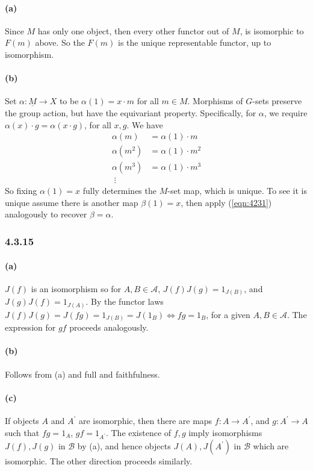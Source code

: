 \documentclass{article}
\begin{document}
\paragraph{(a)} Since $M$ has only one object, then every other functor out of $M$, is isomorphic to $F(m)$ above. So the $F(m)$ is the unique representable functor, up to isomorphism.

\paragraph{(b)} Set $\alpha\colon \underline{M}  \rightarrow X$ to be $\alpha(1) = x \cdot m$ for all $m \in M$. Morphisms of $G$-sets preserve the group action, but have the equivariant property. Specifically, for $\alpha$, we require $\alpha(x) \cdot g = \alpha (x \cdot g)$, for all $x, g$. We have
\begin{equation}
\label{eqn:4231}
\begin{aligned}
  \alpha(m) &= \alpha(1) \cdot m \\
  \alpha(m^2) &= \alpha(1) \cdot m^2 \\
  \alpha(m^3) &= \alpha(1) \cdot m^3 \\
  \; \vdots
\end{aligned}
\end{equation}
So fixing $\alpha(1) = x$ fully determines the $M$-set map, which is unique. To see it is unique assume there is another map $\beta(1) = x$, then apply (\ref{eqn:4231}) analogously to recover $\beta = \alpha$.

\subsubsection*{4.3.15}

\paragraph{(a)}
$J(f)$ is an isomorphism so for $A, B \in \mathcal{A}$, $J(f)J(g) = 1_{J(B)}$, and $J(g)J(f) = 1_{J(A)}$. By the functor laws $J(f)J(g)=J(fg)=1_{J(B)}=J(1_B) \iff fg = 1_B$, for a given $A, B \in \mathcal{A}$. The expression for $gf$ proceeds analogously.

\paragraph{(b)} Follows from (a) and full and faithfulness.

\paragraph{(c)} If objects $A$ and $A^\prime$ are isomorphic, then there are maps $f\colon A \rightarrow A^\prime$, and $g\colon A^\prime \rightarrow A$ such that $fg = 1_A$, $gf=1_{A^\prime}$. The existence of $f, g$ imply isomorphisms $J(f), J(g)$ in $\mathcal{B}$ by (a), and hence objects $J(A), J(A^\prime)$ in $\mathcal{B}$ which are isomorphic. The other direction proceeds similarly.
\end{document}
